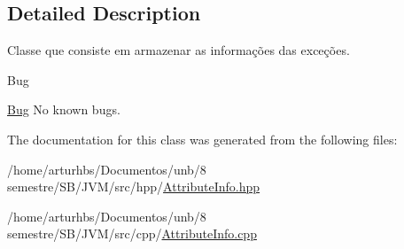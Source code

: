 \subsection{Detailed Description}
Classe que consiste em armazenar as informações das exceções. 

\begin{DoxyRefDesc}{Bug}
\item[\hyperlink{bug__bug000003}{Bug}]No known bugs. \end{DoxyRefDesc}


The documentation for this class was generated from the following files\+:\begin{DoxyCompactItemize}
\item 
/home/arturhbs/\+Documentos/unb/8 semestre/\+S\+B/\+J\+V\+M/src/hpp/\hyperlink{AttributeInfo_8hpp}{Attribute\+Info.\+hpp}\item 
/home/arturhbs/\+Documentos/unb/8 semestre/\+S\+B/\+J\+V\+M/src/cpp/\hyperlink{AttributeInfo_8cpp}{Attribute\+Info.\+cpp}\end{DoxyCompactItemize}
